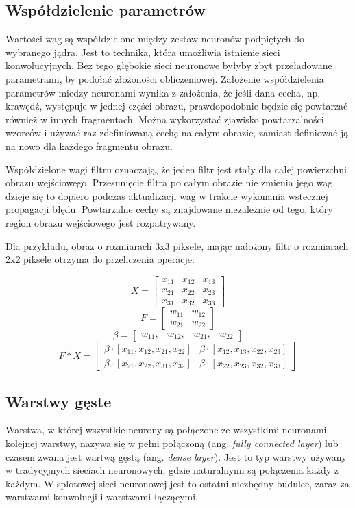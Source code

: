 \documentclass[12pt,a4paper,twoside,titlepage,openright]{book}
\begin{document}
\begin{itemize}
\subsection{Współdzielenie parametrów}
Wartości wag są współdzielone między zestaw neuronów podpiętych do wybranego jądra. Jest to technika, która umożliwia istnienie sieci konwolucyjnych. Bez tego głębokie sieci neuronowe byłyby zbyt przeładowane parametrami, by podołać złożoności obliczeniowej. Założenie współdzielenia parametrów miedzy neuronami wynika z założenia, że jeśli dana cecha, np. krawędź, występuje w jednej części obrazu, prawdopodobnie będzie się powtarzać również w innych fragmentach. Można wykorzystać zjawisko powtarzalności wzorców i używać raz zdefiniowaną cechę na całym obrazie, zamiast definiować ją na nowo dla każdego fragmentu obrazu.

Współdzielone wagi filtru oznaczają, że jeden filtr jest stały dla całej powierzchni obrazu wejściowego. Przesunięcie filtra po całym obrazie nie zmienia jego wag, dzieje się to dopiero podczas aktualizacji wag w trakcie wykonania wstecznej propagacji błędu. Powtarzalne cechy są znajdowane niezależnie od tego, który region obrazu wejściowego jest rozpatrywany.

Dla przykładu, obraz o rozmiarach 3x3 piksele, mając nałożony filtr o rozmiarach 2x2 piksele otrzyma do przeliczenia operacje:

 $$X = 
 \begin{bmatrix} 
 x_{11} & x_{12} & x_{13}  \\ x_{21} & x_{22} & x_{23} \\x_{31} & x_{32} & x_{33} 
 \end{bmatrix}
$$
$$F =  
 \begin{bmatrix} 
 w_{11} & w_{12} \\ w_{21} & w_{22} 
 \end{bmatrix}
$$
 $$\beta = 
 \begin{bmatrix} 
 w_{11}, & w_{12}, & w_{21}, & w_{22} 
 \end{bmatrix}
$$
 $$F * X =  
 \begin{bmatrix}  
\beta \cdot [x_{11}, x_{12}, x_{21}, x_{22}] & \beta \cdot [x_{12}, x_{13}, x_{22}, x_{23}] \\
\beta \cdot [x_{21}, x_{22}, x_{31}, x_{32}] & \beta \cdot [x_{22}, x_{23}, x_{32}, x_{33}] 
 \end{bmatrix}
$$

\subsection{Warstwy gęste}
Warstwa, w której wszystkie neurony są połączone ze wszystkimi neuronami kolejnej warstwy, nazywa się w pełni połączoną (ang. \textit{fully connected layer}) lub czasem zwana jest wartwą gęstą (ang. \textit{dense layer}). Jest to typ warstwy używany w tradycyjnych sieciach neuronowych, gdzie naturalnymi są połączenia każdy z każdym. W splotowej sieci neuronowej jest to ostatni niezbędny budulec, zaraz za warstwami konwolucji i warstwami łączącymi.


\end{itemize}
\end{document}
